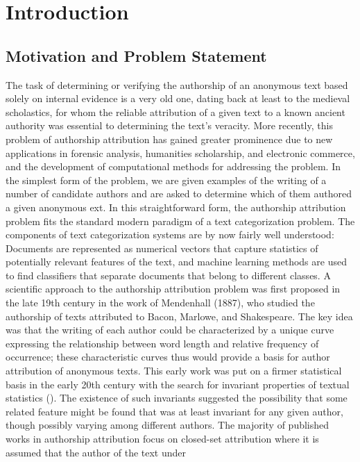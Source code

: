 \chapter{Introduction}
\section{Motivation and Problem Statement}
The task of determining or verifying the authorship of an anonymous text based solely on internal evidence is a very old one, dating back at least to the medieval scholastics, for whom the reliable attribution of a given text to a known ancient authority was essential to determining the text’s veracity. More recently, this problem of authorship attribution has gained greater prominence due to new applications in forensic analysis, humanities scholarship, and electronic commerce, and the development of computational methods for addressing the problem.
In the simplest form of the problem, we are given examples
of the writing of a number of candidate authors and are asked
to determine which of them authored a given anonymous
ext. In this straightforward form, the authorship attribution
problem fits the standard modern paradigm of a text categorization problem. The components of text categorization systems are by
now fairly well understood: Documents are represented as
numerical vectors that capture statistics of potentially relevant features of the text, and machine learning methods are
used to find classifiers that separate documents that belong
to different classes.
A scientific approach to the authorship attribution problem was first proposed in the late 19th century in the work of Mendenhall (1887), who studied the authorship of texts attributed to Bacon, Marlowe, and Shakespeare.
The key idea was that
the writing of each author could be characterized by a unique
curve expressing the relationship between word length and
relative frequency of occurrence; these characteristic curves
thus would provide a basis for author attribution of anonymous texts. This early work was put on a firmer statistical
basis in the early 20th century with the search for invariant properties of textual statistics \citeauthor{zipf1932selected} (\citeyear{zipf1932selected}). The existence
of such invariants suggested the possibility that some related
feature might be found that was at least invariant for any given
author, though possibly varying among different authors.
The majority of published works in authorship
attribution focus on closed-set attribution where
it is assumed that the author of the text under
